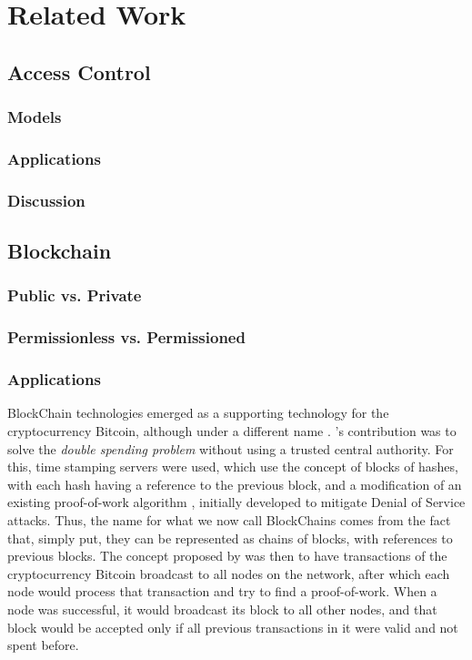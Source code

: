 \chapter{Related Work}
\label{chap:related}

\section{Access Control}

\subsection{Models}

\subsection{Applications}

\subsection{Discussion}

\section{Blockchain}

\subsection{Public vs. Private}

\subsection{Permissionless vs. Permissioned}

\subsection{Applications}

BlockChain technologies emerged as a supporting technology for the cryptocurrency Bitcoin, although under a different name \cite{nakamoto_bitcoin:_2008}. \citeauthor{nakamoto_bitcoin:_2008}'s contribution was to solve the \textit{double spending problem} without using a trusted central authority. For this, time stamping servers were used, which use the concept of blocks of hashes, with each hash having a reference to the previous block, and a modification of an existing proof-of-work algorithm \cite{back_hashcash_2002}, initially developed to mitigate Denial of Service attacks. Thus, the name for what we now call BlockChains comes from the fact that, simply put, they can be represented as chains of blocks, with references to previous blocks. The concept proposed by \citeauthor{nakamoto_bitcoin:_2008} was then to have transactions of the cryptocurrency Bitcoin broadcast to all nodes on the network, after which each node would process that transaction and try to find a proof-of-work. When a node was successful, it would broadcast its block to all other nodes, and that block would be accepted only if all previous transactions in it were valid and not spent before.
  
